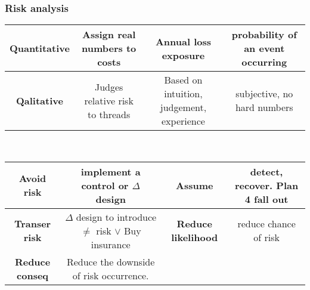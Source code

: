 \documentclass[a4paper,1pt]{article}
\begin{document}
\subsubsection{Risk analysis} %
\label{sub:Risk analysis}
\begin{tabular}{| c | c | c | c |}
  \hline
  {\bf Quantitative} & Assign real numbers to costs & Annual loss exposure & probability of an event occurring \\
  \hline
  {\bf Qalitative} & Judges relative risk to threads & Based on intuition, judgement, experience& subjective, no hard numbers \\
  \hline
\end{tabular} \\
\begin{tabular}{| c | c| c | c |}
  \hline
  {\bf Avoid risk} & implement a control or $\Delta$ design & {\bf Assume} & detect, recover. Plan 4 fall out \\
  \hline
  {\bf Transer risk} & $\Delta$ design to introduce $\neq$ risk $\lor$ Buy insurance & {\bf Reduce likelihood} & reduce chance of risk\\
  \hline
  {\bf Reduce conseq} & Reduce the downside of risk occurrence. \\
  \hline
\end{tabular}
\end{document}
